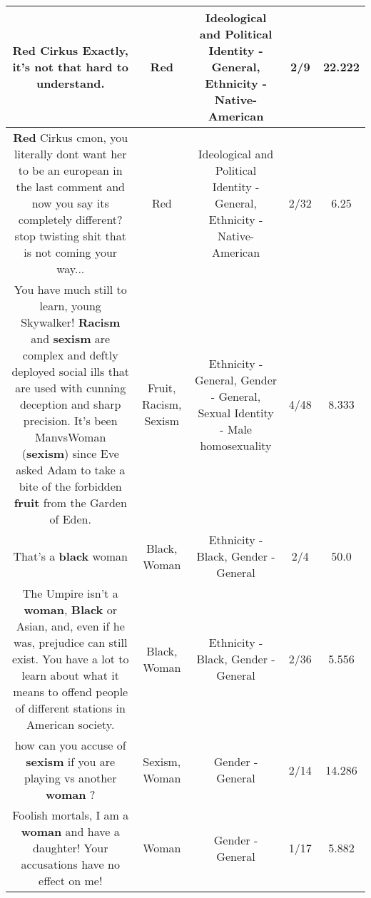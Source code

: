 \documentclass[11pt]{article}
\newlength\mylength
\begin{document}
\begin{center}
\begin{longtable}{|C{.65\mylength}|C{.30\mylength}|C{.12\mylength}|C{.12\mylength}|C{.12\mylength}|}
  \small \@\textbf{R\textbf{ed}} Cirkus Exactly, it's not that hard to understand.\normalsize   & Red &  Ideological and Political Identity - General, Ethnicity - Native-American & 2/9 & 22.222 \\  \hline
  \small \@\textbf{R\textbf{ed}} Cirkus cmon, you literally dont want her to be an european in the last comment and now you say its completely different? stop twisting shit that is not coming your way...\normalsize   & Red &  Ideological and Political Identity - General, Ethnicity - Native-American & 2/32 & 6.25 \\  \hline
  \small You have much still to learn, young Skywalker!  \textbf{Racism} and \textbf{sexism} are complex and deftly deployed social ills that are used with cunning deception and sharp precision.  It's been ManvsWoman (\textbf{sexism}) since Eve asked Adam to take a bite of the forbidden \textbf{fruit} from the Garden of Eden.\normalsize   & Fruit, Racism, Sexism & Ethnicity - General, Gender - General, Sexual Identity - Male homosexuality & 4/48 & 8.333 \\  \hline
  \small That's a \textbf{black} woman\normalsize   & Black, Woman & Ethnicity - Black, Gender - General & 2/4 & 50.0 \\  \hline
  \small The Umpire isn't a \textbf{woman}, \textbf{Black} or Asian, and, even if he was, prejudice can still exist.  You have a lot to learn about what it means to offend people of different stations in American society.\normalsize   & Black, Woman & Ethnicity - Black, Gender - General & 2/36 & 5.556 \\  \hline
  \small how can you accuse of \textbf{sexism} if you are playing vs another \textbf{woman} ?\normalsize   & Sexism, Woman & Gender - General & 2/14 & 14.286 \\  \hline
  \small Foolish mortals, I am a \textbf{woman} and have a daughter! Your accusations have no effect on me!\normalsize   & Woman & Gender - General & 1/17 & 5.882 \\  \hline

\end{longtable}
\end{center}
\end{document}
